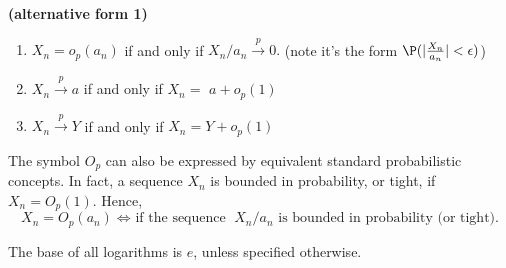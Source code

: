 \documentclass{article}
\newcommand{\bfs}[1]{\textbf{({#1}) }}
\begin{document}
\begin{rema}{\bfs{alternative form 1}}
\begin{enumerate}
    \item $X_{n}=o_{p}\left(a_{n}\right)$ if and only if $X_{n} / a_{n} \stackrel{p}{\rightarrow} 0 .$ (note it's the form $\P(|\frac{X_n}{a_n}|<\epsilon)$)
    \item $X_{n} \stackrel{p}{\rightarrow} a$ if and only if $X_{n}=$
$a+o_{p}(1)$
\item $X_{n} \stackrel{p}{\rightarrow} Y$ if and only if $X_{n}=Y+o_{p}(1)$
\end{enumerate}
\end{rema}
\begin{rema}
The symbol $O_{p}$ can also be expressed by equivalent standard probabilistic concepts. In fact, a sequence $X_{n}$ is bounded in probability, or tight, if $X_{n}=O_{p}(1) .$ Hence, 
$$X_{n}=O_{p}\left(a_{n}\right)\text{$\Longleftrightarrow$ if the sequence }X_{n} / a_{n}\text{ is bounded in probability (or tight).}$$
\end{rema} 

The base of all logarithms is $e$, unless specified otherwise.
\end{document}
